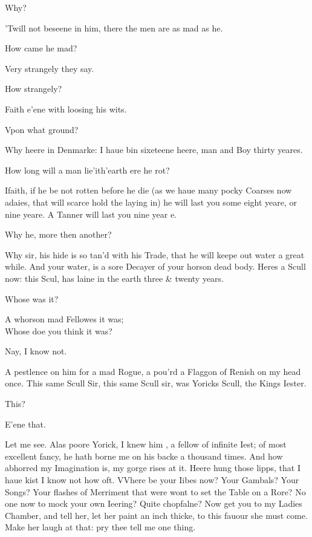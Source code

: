 \documentclass[a5paper,DIV=calc,11pt]{scrbook}
\begin{document}
\begin{drama*}
    \hamspeaks Why?
    
     'Twill not beseene in him, there the men are as mad as he.
    
    \hamspeaks How came he mad?
    
     Very strangely they say.
    
    \hamspeaks How strangely?
    
     Faith e'ene with loosing his wits.
    
    \hamspeaks Vpon what ground?
    
     Why heere in Denmarke: I haue bin sixeteene heere, man and Boy thirty yeares.
    
    \hamspeaks How long will a man lie'ith'earth ere he rot?
    
     Ifaith, if he be not rotten before he die (as we haue many pocky Coarses now adaies, that will scarce hold the laying in) he will last you some eight yeare, or nine yeare. A Tanner will last you nine year e.
    
    \hamspeaks Why he, more then another?
    
     Why sir, his hide is so tan'd with his Trade, that he will keepe out water a great while. And your water, is a sore Decayer of your horson dead body. Heres a Scull now: this Scul, has laine in the earth three \& twenty years.
    
    \hamspeaks Whose was it?
    
     A whorson mad Fellowes it was;\\
    Whose doe you think it was?
    
    \hamspeaks Nay, I know not.
    
     A pestlence on him for a mad Rogue, a pou'rd a Flaggon of Renish on my head once. This same Scull Sir, this same Scull sir, was Yoricks Scull, the Kings Iester.
    
    \hamspeaks This?
    
     E'ene that.
    
    \hamspeaks Let me see. Alas poore Yorick, I knew him \hor, a fellow of infinite Iest; of most excellent fancy, he hath borne me on his backe a thousand times. And how abhorred my Imagination is, my gorge rises at it. Heere hung those lipps, that I haue kist I know not how oft. VVhere be your Iibes now? Your Gambals? Your Songs? Your flashes of Merriment that were wont to set the Table on a Rore? No one now to mock your own Ieering? Quite chopfalne? Now get you to my Ladies Chamber, and tell her, let her paint an inch thicke, to this fauour she must come. Make her laugh at that: pry thee \hor tell me one thing.
    

\end{drama*}
\end{document}
